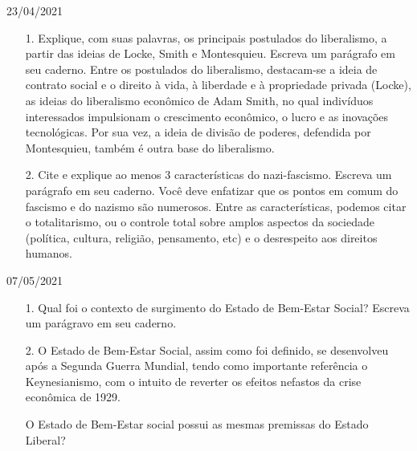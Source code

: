 \documentclass{SchoolBook}
\begin{document}
    \begin{day}{23/04/2021}
        \begin{enumerate}
            \item[1.] Explique, com suas palavras, os principais postulados do liberalismo, a partir das ideias de Locke, Smith e Montesquieu. Escreva um parágrafo em seu caderno.
            \response Entre os postulados do liberalismo, destacam-se a ideia de contrato social e o direito à vida, à liberdade e à propriedade privada (Locke), as ideias do liberalismo econômico de Adam Smith, no qual indivíduos interessados impulsionam o crescimento econômico, o lucro e as inovações tecnológicas.
            Por sua vez, a ideia de divisão de poderes, defendida por Montesquieu, também é outra base do liberalismo.

            \item[2.] Cite e explique ao menos 3 características do nazi-fascismo. Escreva um parágrafo em seu caderno.
            \response Você deve enfatizar que os pontos em comum do fascismo e do nazismo são numerosos. Entre as características, podemos citar o totalitarismo, ou o controle total sobre amplos aspectos da sociedade (política, cultura, religião, pensamento, etc) e o desrespeito aos direitos humanos.
        \end{enumerate}
    \end{day}
    
    \begin{day}{07/05/2021}
        \begin{enumerate}
            \item[1.] Qual foi o contexto de surgimento do Estado de Bem-Estar Social? Escreva um parágravo em seu caderno.
            
            \item[2.] O Estado de Bem-Estar Social, assim como foi definido, se desenvolveu após a Segunda Guerra Mundial, tendo como importante referência o Keynesianismo, com o intuito de reverter os efeitos nefastos da crise econômica de 1929.
            
            O Estado de Bem-Estar social possui as mesmas premissas do Estado Liberal?
        \end{enumerate}
    \end{day}
\end{document}
